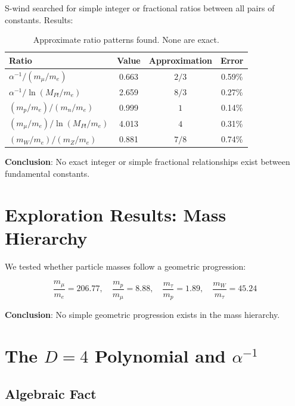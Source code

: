 \documentclass[11pt,a4paper]{article}
\begin{document}
S-wind searched for simple integer or fractional ratios between all pairs of constants. Results:

\begin{table}[h]
\centering
\begin{tabular}{|l|c|c|c|}
\hline
Ratio & Value & Approximation & Error \\
\hline
$\alpha^{-1} / (m_\mu/m_e)$ & 0.663 & $2/3$ & 0.59\% \\
$\alpha^{-1} / \ln(M_{Pl}/m_e)$ & 2.659 & $8/3$ & 0.27\% \\
$(m_p/m_e) / (m_n/m_e)$ & 0.999 & $1$ & 0.14\% \\
$(m_\mu/m_e) / \ln(M_{Pl}/m_e)$ & 4.013 & $4$ & 0.31\% \\
$(m_W/m_e) / (m_Z/m_e)$ & 0.881 & $7/8$ & 0.74\% \\
\hline
\end{tabular}
\caption{Approximate ratio patterns found. None are exact.}
\end{table}

\textbf{Conclusion}: No exact integer or simple fractional relationships exist between fundamental constants.

\section{Exploration Results: Mass Hierarchy}

We tested whether particle masses follow a geometric progression:

\begin{equation}
\frac{m_\mu}{m_e} = 206.77, \quad
\frac{m_p}{m_\mu} = 8.88, \quad
\frac{m_\tau}{m_p} = 1.89, \quad
\frac{m_W}{m_\tau} = 45.24
\end{equation}

\textbf{Conclusion}: No simple geometric progression exists in the mass hierarchy.

\section{The $D=4$ Polynomial and $\alpha^{-1}$}

\subsection{Algebraic Fact}
\end{document}

